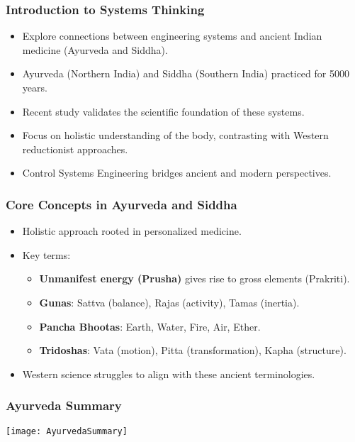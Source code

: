 \begin{frame}[fragile]\frametitle{Introduction to Systems Thinking}
      \begin{itemize}
        \item Explore connections between engineering systems and ancient Indian medicine (Ayurveda and Siddha).
        \item Ayurveda (Northern India) and Siddha (Southern India) practiced for 5000 years.
        \item Recent study validates the scientific foundation of these systems.
        \item Focus on holistic understanding of the body, contrasting with Western reductionist approaches.
        \item Control Systems Engineering bridges ancient and modern perspectives.
      \end{itemize}
\end{frame}

\begin{frame}[fragile]\frametitle{Core Concepts in Ayurveda and Siddha}
      \begin{itemize}
        \item Holistic approach rooted in personalized medicine.
        \item Key terms: 
          \begin{itemize}
            \item \textbf{Unmanifest energy (Prusha)} gives rise to gross elements (Prakriti).
            \item \textbf{Gunas}: Sattva (balance), Rajas (activity), Tamas (inertia).
            \item \textbf{Pancha Bhootas}: Earth, Water, Fire, Air, Ether.
            \item \textbf{Tridoshas}: Vata (motion), Pitta (transformation), Kapha (structure).
          \end{itemize}
        \item Western science struggles to align with these ancient terminologies.
      \end{itemize}
\end{frame}


\begin{frame}[fragile]\frametitle{Ayurveda Summary}

\begin{center}
\texttt{[image: AyurvedaSummary]}
\end{center}	  
\end{frame}

